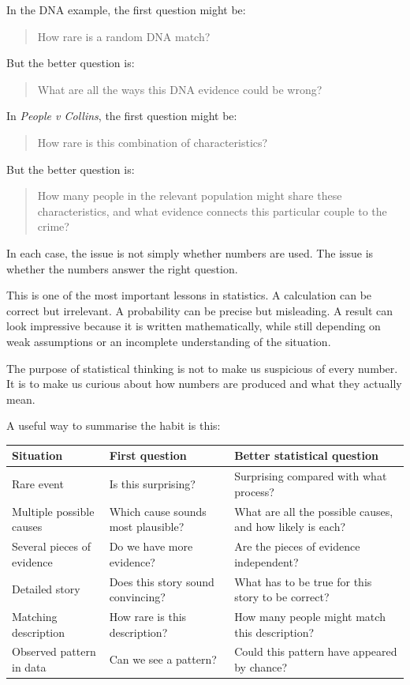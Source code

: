 \documentclass[
  letterpaper,
  DIV=11,
  numbers=noendperiod]{scrreprt}
\begin{document}
In the DNA example, the first question might be:

\begin{quote}
How rare is a random DNA match?
\end{quote}

But the better question is:

\begin{quote}
What are all the ways this DNA evidence could be wrong?
\end{quote}

In \emph{People v Collins}, the first question might be:

\begin{quote}
How rare is this combination of characteristics?
\end{quote}

But the better question is:

\begin{quote}
How many people in the relevant population might share these
characteristics, and what evidence connects this particular couple to
the crime?
\end{quote}

In each case, the issue is not simply whether numbers are used. The
issue is whether the numbers answer the right question.

This is one of the most important lessons in statistics. A calculation
can be correct but irrelevant. A probability can be precise but
misleading. A result can look impressive because it is written
mathematically, while still depending on weak assumptions or an
incomplete understanding of the situation.

The purpose of statistical thinking is not to make us suspicious of
every number. It is to make us curious about how numbers are produced
and what they actually mean.

A useful way to summarise the habit is this:

\begin{table}
\fontsize{12.0pt}{14.0pt}\selectfont
\begin{tabular*}{\linewidth}{@{\extracolsep{\fill}}lll}
\toprule
Situation & First question & Better statistical question \\ 
\midrule\addlinespace[2.5pt]
Rare event & Is this surprising? & Surprising compared with what process? \\ 
Multiple possible causes & Which cause sounds most plausible? & What are all the possible causes, and how likely is each? \\ 
Several pieces of evidence & Do we have more evidence? & Are the pieces of evidence independent? \\ 
Detailed story & Does this story sound convincing? & What has to be true for this story to be correct? \\ 
Matching description & How rare is this description? & How many people might match this description? \\ 
Observed pattern in data & Can we see a pattern? & Could this pattern have appeared by chance? \\ 
\bottomrule
\end{tabular*}
\end{table}
\end{document}
